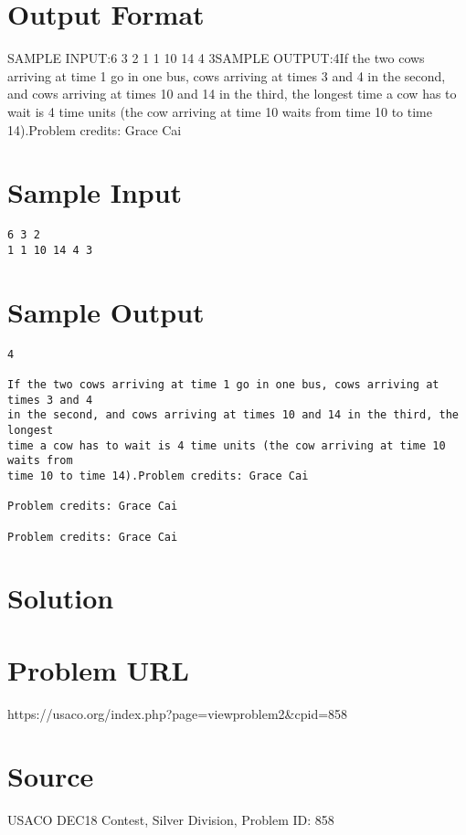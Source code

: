 \documentclass[12pt]{article}
\begin{document}
\section*{Output Format}
SAMPLE INPUT:6 3 2
1 1 10 14 4 3SAMPLE OUTPUT:4If the two cows arriving at time 1 go in one bus, cows arriving at times 3 and 4
in the second, and cows arriving at times 10 and 14 in the third, the longest
time a cow has to wait is 4 time units (the cow arriving at time 10 waits from
time 10 to time 14).Problem credits: Grace Cai

\section*{Sample Input}
\begin{verbatim}
6 3 2
1 1 10 14 4 3
\end{verbatim}

\section*{Sample Output}
\begin{verbatim}
4

If the two cows arriving at time 1 go in one bus, cows arriving at times 3 and 4
in the second, and cows arriving at times 10 and 14 in the third, the longest
time a cow has to wait is 4 time units (the cow arriving at time 10 waits from
time 10 to time 14).Problem credits: Grace Cai

Problem credits: Grace Cai

Problem credits: Grace Cai
\end{verbatim}

\section*{Solution}


\section*{Problem URL}
https://usaco.org/index.php?page=viewproblem2&cpid=858

\section*{Source}
USACO DEC18 Contest, Silver Division, Problem ID: 858
\end{document}
